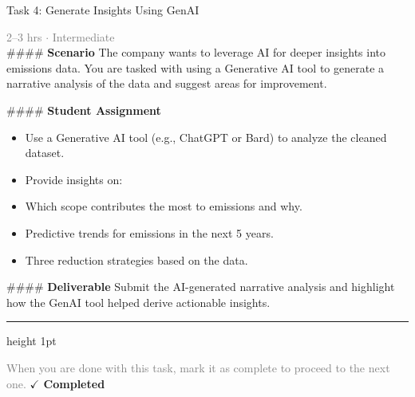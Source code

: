 \documentclass[10pt,a4paper]{article}
\begin{document}
\begin{taskbox}{Task 4: Generate Insights Using GenAI}

    {\small \textcolor{gray}{2--3 hrs $\cdot$ Intermediate}}\\[12pt]

    \#\#\#\# \textbf{Scenario}  
The company wants to leverage AI for deeper insights into emissions data. You are tasked with using a Generative AI tool to generate a narrative analysis of the data and suggest areas for improvement.

\#\#\#\# \textbf{Student Assignment}
\begin{itemize}
    \item Use a Generative AI tool (e.g., ChatGPT or Bard) to analyze the cleaned dataset.  
    \item Provide insights on:  
    \item Which scope contributes the most to emissions and why.  
    \item Predictive trends for emissions in the next 5 years.  
    \item Three reduction strategies based on the data.  
\end{itemize}

\#\#\#\# \textbf{Deliverable}  
Submit the AI-generated narrative analysis and highlight how the GenAI tool helped derive actionable insights.\par

    \vspace{16pt}

    \textcolor{cardBorder}{\hrule height 1pt}\vspace{8pt}

    \small \textcolor{gray}{When you are done with this task, mark it as complete to proceed to the next one.} \hfill \textbf{\textcolor{brandDark}{$\checkmark$ Completed}}

\end{taskbox}
\end{document}

